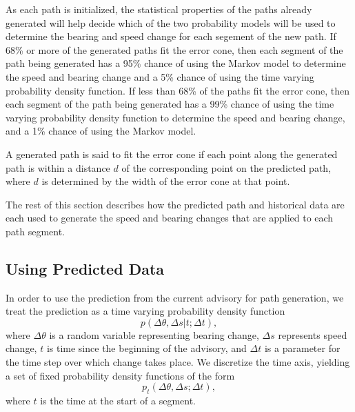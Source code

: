 \documentclass[journal]{vgtc}                %
\begin{document}
As each path is initialized, the statistical properties of the paths already generated will help decide which of the two probability models will be used to determine the bearing and speed change for each segement of the new path.  If 68\% or more of the generated paths fit the error cone, then each segment of the path being generated has a 95\% chance of using the Markov model to determine the speed and bearing change and a 5\% chance of using the time varying probability density function.  If less than 68\% of the paths fit the error cone, then each segment of the path being generated has a 99\% chance of using the time varying probability density function to determine the speed and bearing change, and a 1\% chance of using the Markov model.

A generated path is said to fit the error cone if each point along the generated path is within a distance $d$ of the corresponding point on the predicted path, where $d$ is determined by the width of the error cone at that point. 


The rest of this section describes how the predicted path and historical data are each used to generate the 
speed and bearing changes that are applied to each path segment.

\subsection{Using Predicted Data}

In order to use the prediction from the current advisory for path generation,
we treat the prediction as a time varying probability density function
\[
  p(\Delta \theta, \Delta s | t; \Delta t),
\]
where $\Delta \theta$ is a random variable representing bearing change, $\Delta s$ represents speed change,
$t$ is time since the beginning of the advisory, and $\Delta t$ is a parameter for the time step over which 
change takes place.
We discretize the
time axis, yielding a set of fixed probability density functions of the form
\[
  p_{t}(\Delta\theta, \Delta s; \Delta t),
  \label{eq:pre_fin}
\]
where $t$ is the time at the start of a segment.  
\end{document}
